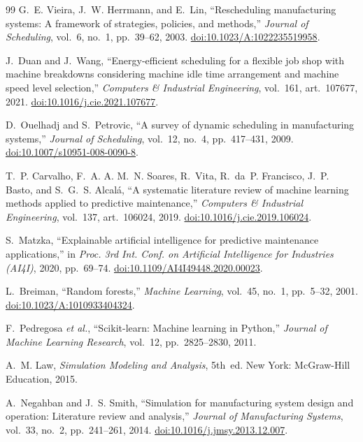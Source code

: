 \documentclass[11pt,a4paper]{article}
\begin{document}
\begin{thebibliography}{99}
 G.~E. Vieira, J.~W. Herrmann, and E.~Lin, ``Rescheduling manufacturing systems: A framework of strategies, policies, and methods,'' \emph{Journal of Scheduling}, vol.~6, no.~1, pp.~39--62, 2003. \href{https://doi.org/10.1023/A:1022235519958}{doi:10.1023/A:1022235519958}.

 J.~Duan and J.~Wang, ``Energy-efficient scheduling for a flexible job shop with machine breakdowns considering machine idle time arrangement and machine speed level selection,'' \emph{Computers \& Industrial Engineering}, vol.~161, art.~107677, 2021. \href{https://doi.org/10.1016/j.cie.2021.107677}{doi:10.1016/j.cie.2021.107677}.

 D.~Ouelhadj and S.~Petrovic, ``A survey of dynamic scheduling in manufacturing systems,'' \emph{Journal of Scheduling}, vol.~12, no.~4, pp.~417--431, 2009. \href{https://doi.org/10.1007/s10951-008-0090-8}{doi:10.1007/s10951-008-0090-8}.

 T.~P. Carvalho, F.~A. A. M.~N. Soares, R.~Vita, R.~da~P. Francisco, J.~P. Basto, and S.~G.~S. Alcal\'a, ``A systematic literature review of machine learning methods applied to predictive maintenance,'' \emph{Computers \& Industrial Engineering}, vol.~137, art.~106024, 2019. \href{https://doi.org/10.1016/j.cie.2019.106024}{doi:10.1016/j.cie.2019.106024}.

 S.~Matzka, ``Explainable artificial intelligence for predictive maintenance applications,'' in \emph{Proc. 3rd Int. Conf. on Artificial Intelligence for Industries (AI4I)}, 2020, pp.~69--74. \href{https://doi.org/10.1109/AI4I49448.2020.00023}{doi:10.1109/AI4I49448.2020.00023}.

 L.~Breiman, ``Random forests,'' \emph{Machine Learning}, vol.~45, no.~1, pp.~5--32, 2001. \href{https://doi.org/10.1023/A:1010933404324}{doi:10.1023/A:1010933404324}.

 F.~Pedregosa \emph{et al.}, ``Scikit-learn: Machine learning in Python,'' \emph{Journal of Machine Learning Research}, vol.~12, pp.~2825--2830, 2011.

 A.~M. Law, \emph{Simulation Modeling and Analysis}, 5th~ed. New York: McGraw-Hill Education, 2015.

 A.~Negahban and J.~S. Smith, ``Simulation for manufacturing system design and operation: Literature review and analysis,'' \emph{Journal of Manufacturing Systems}, vol.~33, no.~2, pp.~241--261, 2014. \href{https://doi.org/10.1016/j.jmsy.2013.12.007}{doi:10.1016/j.jmsy.2013.12.007}.


\end{thebibliography}
\end{document}
